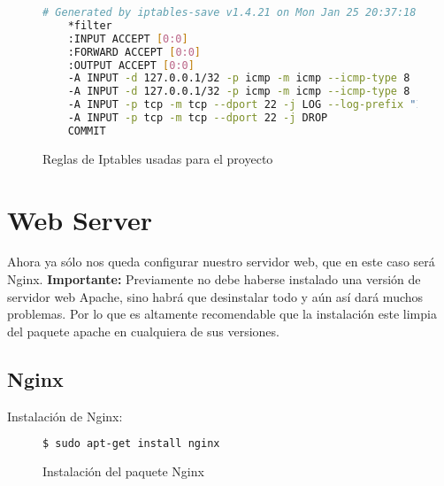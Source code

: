 \begin{figure}[H]
  \begin{lstlisting}[language=bash]
    # Generated by iptables-save v1.4.21 on Mon Jan 25 20:37:18 2016
    *filter
    :INPUT ACCEPT [0:0]
    :FORWARD ACCEPT [0:0]
    :OUTPUT ACCEPT [0:0]
    -A INPUT -d 127.0.0.1/32 -p icmp -m icmp --icmp-type 8 -m state --state NEW,RELATED,ESTABLISHED -j LOG --log-prefix "IPTMSG=Connection ICMP "
    -A INPUT -d 127.0.0.1/32 -p icmp -m icmp --icmp-type 8 -m state --state NEW,RELATED,ESTABLISHED -j DROP
    -A INPUT -p tcp -m tcp --dport 22 -j LOG --log-prefix "IPTMSG=Connection SSH "
    -A INPUT -p tcp -m tcp --dport 22 -j DROP
    COMMIT
  \end{lstlisting}
  \caption{Reglas de Iptables usadas para el proyecto}
\end{figure}

\section{Web Server}

Ahora ya sólo nos queda configurar nuestro servidor web, que en este caso será Nginx. \textbf{Importante:} Previamente no debe haberse instalado una versión de servidor web Apache, sino habrá que desinstalar todo y aún así dará muchos problemas. Por lo que es altamente recomendable que la instalación este limpia del paquete apache en cualquiera de sus versiones.

\subsection{Nginx}

Instalación de Nginx:

\begin{figure}[H]
  \begin{lstlisting}[language=bash]
    $ sudo apt-get install nginx
  \end{lstlisting}
  \caption{Instalación del paquete Nginx}
\end{figure}

